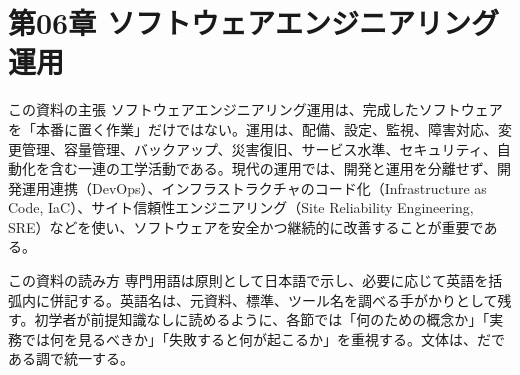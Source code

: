 \section{第06章 ソフトウェアエンジニアリング運用}
\begin{pointbox}{この資料の主張}
  ソフトウェアエンジニアリング運用は、完成したソフトウェアを「本番に置く作業」だけではない。運用は、配備、設定、監視、障害対応、変更管理、容量管理、バックアップ、災害復旧、サービス水準、セキュリティ、自動化を含む一連の工学活動である。現代の運用では、開発と運用を分離せず、開発運用連携（DevOps）、インフラストラクチャのコード化（Infrastructure as Code, IaC）、サイト信頼性エンジニアリング（Site Reliability Engineering, SRE）などを使い、ソフトウェアを安全かつ継続的に改善することが重要である。
  \end{pointbox}

\begin{pointbox}{この資料の読み方}
  専門用語は原則として日本語で示し、必要に応じて英語を括弧内に併記する。英語名は、元資料、標準、ツール名を調べる手がかりとして残す。初学者が前提知識なしに読めるように、各節では「何のための概念か」「実務では何を見るべきか」「失敗すると何が起こるか」を重視する。文体は、だである調で統一する。
  \end{pointbox}
